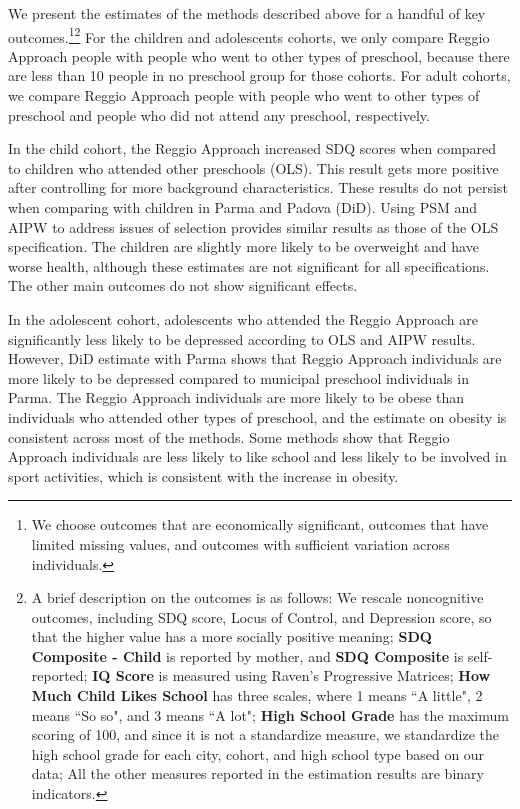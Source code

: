 We present the estimates of the methods described above for a handful of key outcomes.\footnote{We choose outcomes that are economically significant,  outcomes that have limited missing values, and outcomes with sufficient variation across individuals.}\footnote{A brief description on the outcomes is as follows: We rescale noncognitive outcomes, including SDQ score, Locus of Control, and Depression score, so that the higher value has a more socially positive meaning; \textbf{SDQ Composite - Child} is reported by mother, and \textbf{SDQ Composite} is self-reported; \textbf{IQ Score} is measured using Raven's Progressive Matrices; \textbf{How Much Child Likes School} has three scales, where 1 means ``A little", 2 means ``So so", and 3 means ``A lot";  \textbf{High School Grade} has the maximum scoring of 100, and since it is not a standardize measure, we standardize the high school grade for each city, cohort, and high school type based on our data; All the other measures reported in the estimation results are binary indicators. } For the children and adolescents cohorts, we only compare Reggio Approach people with people who went to other types of preschool, because there are less than 10 people in no preschool group for those cohorts. For adult cohorts, we compare Reggio Approach people with people who went to other types of preschool and people who did not attend any preschool, respectively.

In the child cohort, the Reggio Approach increased SDQ scores when compared to children who attended other preschools (OLS). This result gets more positive after controlling for more background characteristics. These results do not persist when comparing with children in Parma and Padova (DiD). Using PSM and AIPW to address issues of selection provides similar results as those of the OLS specification. The children are slightly more likely to be overweight and have worse health, although these estimates are not significant for all specifications. The other main outcomes do not show significant effects.

In the adolescent cohort, adolescents who attended the Reggio Approach are significantly less likely to be depressed according to OLS and AIPW results. However, DiD estimate with Parma shows that Reggio Approach individuals are more likely to be depressed compared to municipal preschool individuals in Parma. The Reggio Approach individuals are more likely to be obese than individuals who attended other types of preschool, and the estimate on obesity is consistent across most of the methods. Some methods show that Reggio Approach individuals are less likely to like school and less likely to be involved in sport activities, which is consistent with the increase in obesity. 

